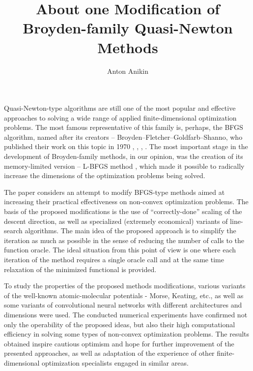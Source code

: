 \documentclass[12pt]{llncs}
\begin{document}
%
\fi

\title{About one Modification of Broyden-family Quasi-Newton Methods}
\author{Anton Anikin}

\maketitle

\begin{abstract}
\end{abstract}

Quasi-Newton-type algorithms are still one of the most popular and effective approaches to solving a wide range of applied finite-dimensional optimization problems. The most famous representative of this family is, perhaps, the BFGS algorithm, named after its creators -- Broyden–Fletcher–Goldfarb–Shanno, who published their work on this topic in 1970 \cite{broyden_1970}, \cite{fletcher_1970}, \cite{goldfarb_1970}, \cite{shanno_1970}. The most important stage in the development of Broyden-family methods, in our opinion, was the creation of its memory-limited version -- L-BFGS method \cite{nocedal_1989}, which made it possible to radically increase the dimensions of the optimization problems being solved.

The paper considers an attempt to modify BFGS-type methods aimed at increasing their practical effectiveness on non-convex optimization problems. The basis of the proposed modifications is the use of ``correctly-done'' scaling of the descent direction, as well as specialized (extremely economical) variants of line-search algorithms. The main idea of the proposed approach is to simplify the iteration as much as possible in the sense of reducing the number of calls to the function oracle. The ideal situation from this point of view is one where each iteration of the method requires a single oracle call and at the same time relaxation of the minimized functional is provided.

To study the properties of the proposed methods modifications, various variants of the well-known atomic-molecular potentials - Morse, Keating, etc., as well as some variants of convolutional neural networks with different architectures and dimensions were used. The conducted numerical experiments have confirmed not only the operability of the proposed ideas, but also their high computational efficiency in solving some types of non-convex op\-ti\-mi\-za\-tion problems. The results obtained inspire cautious optimism and hope for further improvement of the presented approaches, as well as adaptation of the experience of other finite-dimensional optimization specialists engaged in similar areas. %
\end{document}
